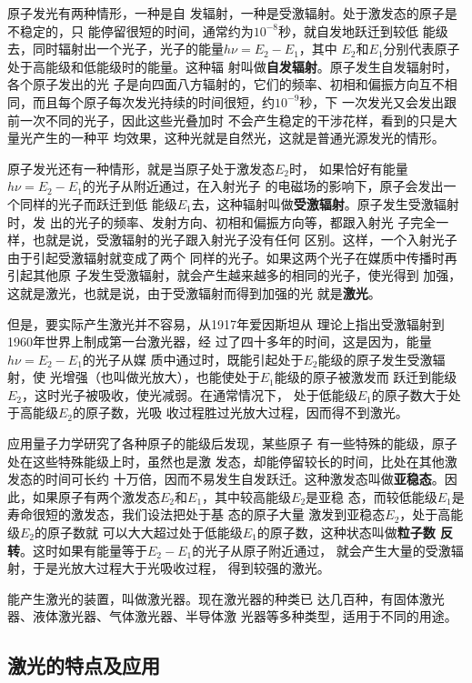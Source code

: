 原子发光有两种情形，一种是自
发辐射，一种是受激辐射。处于激发态的原子是不稳定的，只
能停留很短的时间，通常约为$10^{-8}$秒，就自发地跃迁到较低
能级去，同时辐射出一个光子，光子的能量$h\nu =E_2-E_1$，其中
$E_2$和$E_1$分别代表原子处于高能级和低能级时的能量。这种辐
射叫做\textbf{自发辐射}。原子发生自发辐射时，各个原子发出的光
子是向四面八方辐射的，它们的频率、初相和偏振方向互不相
同，而且每个原子每次发光持续的时间很短，约$10^{-9}$秒，下
一次发光又会发出跟前一次不同的光子，因此这些光叠加时
不会产生稳定的干涉花样，看到的只是大量光产生的一种平
均效果，这种光就是自然光，这就是普通光源发光的情形。

原子发光还有一种情形，就是当原子处于激发态$E_2$时，
如果恰好有能量$h\nu =E_2-E_1$的光子从附近通过，在入射光子
的电磁场的影响下，原子会发出一个同样的光子而跃迁到低
能级$E_1$去，这种辐射叫做\textbf{受激辐射}。原子发生受激辐射时，发
出的光子的频率、发射方向、初相和偏振方向等，都跟入射光
子完全一样，也就是说，受激辐射的光子跟入射光子没有任何
区别。这样，一个入射光子由于引起受激辐射就变成了两个
同样的光子。如果这两个光子在媒质中传播时再引起其他原
子发生受激辐射，就会产生越来越多的相同的光子，使光得到
加强，这就是激光，也就是说，由于受激辐射而得到加强的光
就是\textbf{激光}。

但是，要实际产生激光并不容易，从1917年爱因斯坦从
理论上指出受激辐射到1960年世界上制成第一台激光器，经
过了四十多年的时间，这是因为，能量$h\nu =E_2-E_1$的光子从媒
质中通过时，既能引起处于$E_2$能级的原子发生受激辐射，使
光增强（也叫做光放大），也能使处于$E_1$能级的原子被激发而
跃迁到能级$E_2$，这时光子被吸收，使光减弱。在通常情况下，
处于低能级$E_1$的原子数大于处于高能级$E_2$的原子数，光吸
收过程胜过光放大过程，因而得不到激光。

应用量子力学研究了各种原子的能级后发现，某些原子
有一些特殊的能级，原子处在这些特殊能级上时，虽然也是激
发态，却能停留较长的时间，比处在其他激发态的时间可长约
十万倍，因而不易发生自发跃迁。这种激发态叫做\textbf{亚稳态}。因
此，如果原子有两个激发态$E_2$和$E_1$，其中较高能级$E_2$是亚稳
态，而较低能级$E_1$是寿命很短的激发态，我们设法把处于基
态的原子大量 激发到亚稳态$E_2$，处于高能级$E_2$的原子数就
可以大大超过处于低能级$E_1$的原子数，这种状态叫做\textbf{粒子数
反转}。这时如果有能量等于$E_2-E_1$的光子从原子附近通过，
就会产生大量的受激辐射，于是光放大过程大于光吸收过程，
得到较强的激光。

能产生激光的装置，叫做激光器。现在激光器的种类已
达几百种，有固体激光器、液体激光器、气体激光器、半导体激
光器等多种类型，适用于不同的用途。

\subsection{激光的特点及应用}

